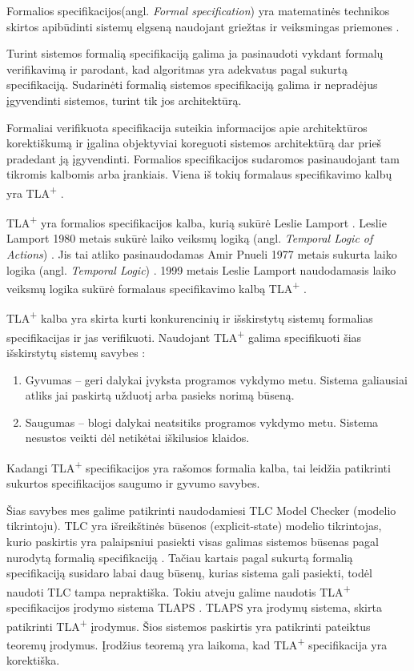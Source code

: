 \documentclass{VUMIFPSmagistrinis}
\begin{document}
        Formalios specifikacijos(angl. {\it Formal specification}) yra matematinės technikos skirtos apibūdinti sistemų elgseną naudojant griežtas ir veiksmingas priemones \cite{holzmann1995improvement}.
        
		Turint sistemos formalią specifikaciją galima ja pasinaudoti vykdant formalų verifikavimą ir parodant, kad algoritmas yra adekvatus pagal sukurtą specifikaciją.
		Sudarinėti formalią sistemos specifikaciją galima ir nepradėjus įgyvendinti sistemos, turint tik jos architektūrą. 
  
		Formaliai verifikuota specifikacija suteikia informacijos apie architektūros korektiškumą ir įgalina objektyviai koreguoti sistemos architektūrą dar prieš pradedant ją įgyvendinti.
		Formalios specifikacijos sudaromos pasinaudojant tam tikromis kalbomis arba įrankiais.
		Viena iš tokių formalaus specifikavimo kalbų yra TLA\textsuperscript{+} \cite{lamport2002specifying}.
		

		TLA\textsuperscript{+} yra formalios specifikacijos kalba, kurią sukūrė Leslie Lamport \cite{lamport2002specifying}.
		Leslie Lamport 1980 metais sukūrė laiko veiksmų logiką (angl. {\it Temporal Logic of Actions}) \cite{10.1145/177492.177726}. Jis tai atliko pasinaudodamas Amir Pnueli 1977 metais sukurta laiko logika (angl. {\it Temporal Logic}) \cite{4567924}.
		1999 metais Leslie Lamport naudodamasis laiko veiksmų logika sukūrė formalaus specifikavimo kalbą TLA\textsuperscript{+} \cite{lamport2002specifying}.
		

        TLA\textsuperscript{+} kalba yra skirta kurti konkurencinių ir išskirstytų sistemų formalias specifikacijas ir jas verifikuoti.
		Naudojant TLA\textsuperscript{+} galima specifikuoti šias išskirstytų sistemų savybes \cite{lamport2019safety}:
  
		\begin{enumerate}
			\item{Gyvumas -- geri dalykai įvyksta programos vykdymo metu. Sistema galiausiai atliks jai paskirtą užduotį arba pasieks norimą būseną.}
			\item{Saugumas -- blogi dalykai neatsitiks programos vykdymo metu. Sistema nesustos veikti dėl netikėtai iškilusios klaidos.}
		\end{enumerate}
  
		Kadangi TLA\textsuperscript{+} specifikacijos yra rašomos formalia kalba, tai leidžia patikrinti sukurtos specifikacijos saugumo ir gyvumo savybes.

	Šias savybes mes galime patikrinti naudodamiesi TLC Model Checker (modelio tikrintoju).
		TLC yra išreikštinės būsenos (explicit-state) modelio tikrintojas, kurio paskirtis yra palaipsniui pasiekti visas galimas sistemos būsenas pagal nurodytą formalią specifikaciją \cite{yu1999model}.
		Tačiau kartais pagal sukurtą formalią specifikaciją susidaro labai daug būsenų, kurias sistema gali pasiekti, todėl naudoti TLC tampa nepraktiška.
		Tokiu atveju galime naudotis TLA\textsuperscript{+} specifikacijos įrodymo sistema TLAPS \cite{cousineau2012tla+}.
		TLAPS yra įrodymų sistema, skirta patikrinti TLA\textsuperscript{+} įrodymus.
		Šios sistemos paskirtis yra patikrinti pateiktus teoremų įrodymus.
		Įrodžius teoremą yra laikoma, kad TLA\textsuperscript{+} specifikacija yra korektiška.
\end{document}
